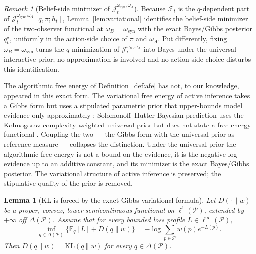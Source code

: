\documentclass[11pt]{article}
\newtheorem{lemma}[theorem]{Lemma}
\theoremstyle{definition}
\theoremstyle{remark}
\newtheorem{remark}[theorem]{Remark}
\newcommand{\Pcal}{\mathcal{P}}
\newcommand{\Fcal}{\mathcal{F}}
\newcommand{\E}{\mathbb{E}}
\newcommand{\KL}{\mathrm{KL}}
\begin{document}
\begin{remark}[Belief-side minimizer of $\mathcal J_t^{\omega_{\mathrm{syn}},\omega_A}$]
\label{rem:afe-bayes-unification}
Because $\Fcal_t$ is the $q$-dependent part of $\mathcal J_t^{\omega_{\mathrm{syn}},\omega_A}[q,\pi;h_t]$, Lemma~\ref{lem:variational} identifies the belief-side minimizer of the two-observer functional at $\omega_B=\omega_{\mathrm{syn}}$ with the exact Bayes/Gibbs posterior $q_t^\star$, uniformly in the action-side choice of $\pi$ and $\omega_A$. Put differently, fixing $\omega_B=\omega_{\mathrm{syn}}$ turns the $q$-minimization of $\mathcal J_t^{\omega_B,\omega_A}$ into Bayes under the universal interactive prior; no approximation is involved and no action-side choice disturbs this identification.

The algorithmic free energy of Definition~\ref{def:afe} has not, to our knowledge, appeared in this exact form. The variational free energy of active inference takes a Gibbs form but uses a stipulated parametric prior that upper-bounds model evidence only approximately \citep{Friston2010,ParrFriston2019}; Solomonoff--Hutter Bayesian prediction uses the Kolmogorov-complexity-weighted universal prior but does not state a free-energy functional \citep{Solomonoff1964a,Solomonoff1964b,Hutter2005}. Coupling the two --- the Gibbs form with the universal prior as reference measure --- collapses the distinction. Under the universal prior the algorithmic free energy is not a bound on the evidence, it is the negative log-evidence up to an additive constant, and its minimizer is the exact Bayes/Gibbs posterior. The variational structure of active inference is preserved; the stipulative quality of the prior is removed.
\end{remark}

\begin{lemma}[KL is forced by the exact Gibbs variational formula]
\label{lem:kl-necessity}
Let $D(\cdot\|w)$ be a proper, convex, lower-semicontinuous functional on $\ell^1(\Pcal)$, extended by $+\infty$ off $\Delta(\Pcal)$. Assume that for every bounded loss profile $L\in\ell^\infty(\Pcal)$,
\[
\inf_{q\in\Delta(\Pcal)}\bigl\{\E_q[L]+D(q\|w)\bigr\}
=
-\log\sum_{p\in\Pcal} w(p)e^{-L(p)}.
\]
Then $D(q\|w)=\KL(q\|w)$ for every $q\in\Delta(\Pcal)$.
\end{lemma}
\end{document}

